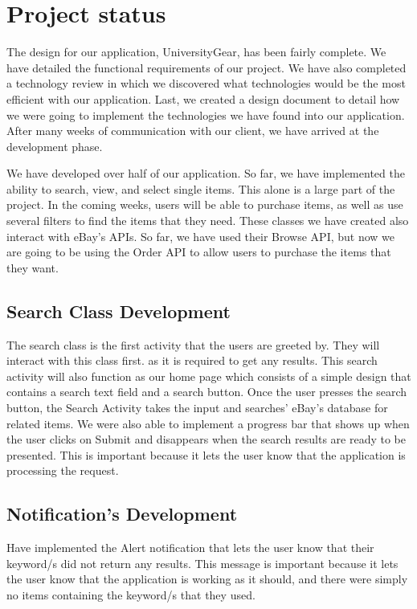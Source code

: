 \documentclass[journal,compsoc, 10pt, draftclsnofoot, onecolumn]{IEEEtran}
\begin{document}
\section{Project status}
The design for our application, UniversityGear, has been fairly complete. We 
have detailed the functional requirements of our project. We have also completed 
a technology review in which we discovered what technologies would be the most 
efficient with our application. Last, we created a design document to detail how 
we were going to implement the technologies we have found into our application.
After many weeks of communication with our client, we have arrived at the 
development phase.\newline

We have developed over half of our application. So far, we have implemented the 
ability to search, view, and select single items. This alone is a large part of 
the project. In the coming weeks, users will be able to purchase items, as well 
as use several filters to find the items that they need. These classes we have 
created also interact with eBay's APIs. So far, we have used their Browse API, 
but now we are going to be using the Order API to allow users to purchase the 
items that they want. 

\subsection{Search Class Development}
The search class is the first activity that the users are greeted by. They will 
interact with this class first. as it is required to get any results. 
This search activity will also function as our home page which consists of a
simple design that contains a search text field and a search button. Once the 
user presses the search button, the Search Activity takes the input and 
searches' eBay's database for related items. We were also able to implement a 
progress bar that shows up when the user clicks on Submit and disappears when 
the search results are ready to be presented. This is important because it lets 
the user know that the application is processing the request. 

\subsection{Notification's Development}
Have implemented the Alert notification that lets the user know that their 
keyword/s did not return any results. This message is important because it 
lets the user know that the application is working as it should, and there 
were simply no items containing the keyword/s that they used.
\end{document}
